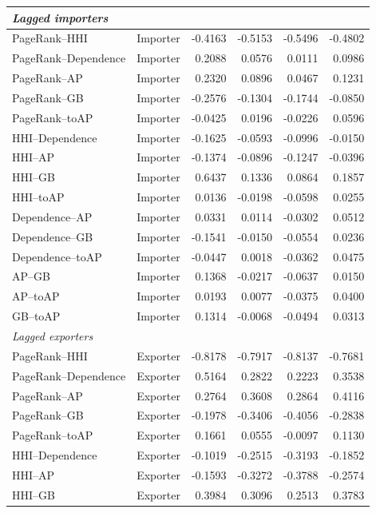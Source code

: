\documentclass[pdftex,12pt,openright,a4paper,oneside]{book}
\begin{document}
\begin{longtable}{llrrrr}
\multicolumn{6}{l}{\textit{Lagged importers}}\\
\midrule
PageRank--HHI & Importer & -0.4163 & -0.5153 & -0.5496 & -0.4802 \\
PageRank--Dependence & Importer & 0.2088 & 0.0576 & 0.0111 & 0.0986 \\
PageRank--AP & Importer & 0.2320 & 0.0896 & 0.0467 & 0.1231 \\
PageRank--GB & Importer & -0.2576 & -0.1304 & -0.1744 & -0.0850 \\
PageRank--toAP & Importer & -0.0425 & 0.0196 & -0.0226 & 0.0596 \\
HHI--Dependence & Importer & -0.1625 & -0.0593 & -0.0996 & -0.0150 \\
HHI--AP & Importer & -0.1374 & -0.0896 & -0.1247 & -0.0396 \\
HHI--GB & Importer & 0.6437 & 0.1336 & 0.0864 & 0.1857 \\
HHI--toAP & Importer & 0.0136 & -0.0198 & -0.0598 & 0.0255 \\
Dependence--AP & Importer & 0.0331 & 0.0114 & -0.0302 & 0.0512 \\
Dependence--GB & Importer & -0.1541 & -0.0150 & -0.0554 & 0.0236 \\
Dependence--toAP & Importer & -0.0447 & 0.0018 & -0.0362 & 0.0475 \\
AP--GB & Importer & 0.1368 & -0.0217 & -0.0637 & 0.0150 \\
AP--toAP & Importer & 0.0193 & 0.0077 & -0.0375 & 0.0400 \\
GB--toAP & Importer & 0.1314 & -0.0068 & -0.0494 & 0.0313 \\
\midrule
\multicolumn{6}{l}{\textit{Lagged exporters}}\\
\midrule
PageRank--HHI & Exporter & -0.8178 & -0.7917 & -0.8137 & -0.7681 \\
PageRank--Dependence & Exporter & 0.5164 & 0.2822 & 0.2223 & 0.3538 \\
PageRank--AP & Exporter & 0.2764 & 0.3608 & 0.2864 & 0.4116 \\
PageRank--GB & Exporter & -0.1978 & -0.3406 & -0.4056 & -0.2838 \\
PageRank--toAP & Exporter & 0.1661 & 0.0555 & -0.0097 & 0.1130 \\
HHI--Dependence & Exporter & -0.1019 & -0.2515 & -0.3193 & -0.1852 \\
HHI--AP & Exporter & -0.1593 & -0.3272 & -0.3788 & -0.2574 \\
HHI--GB & Exporter & 0.3984 & 0.3096 & 0.2513 & 0.3783 \\

\end{longtable}
\end{document}
